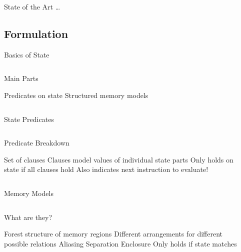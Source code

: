 \begin{frame}{State of the Art}
  \todo\dots
\end{frame}

\subsection{Formulation}

\begin{frame}{Basics of State}
  \begin{columns}
    \begin{block}{Main Parts}
      \begin{outline}[enumerate]
        \1 \alert{Predicates} on state
        \1 Structured \alert{memory models}
      \end{outline}
    \end{block}

  \end{columns}
\end{frame}

\begin{frame}{State Predicates}
  \begin{columns}
    \begin{block}{Predicate Breakdown}
      \begin{outline}
        \1 Set of \alert{clauses}
        \1 Clauses model values of individual \alert{state parts}
        \1 Only holds on state if all clauses hold
        \1 Also indicates next instruction to evaluate!
      \end{outline}
    \end{block}

    \begin{example}[Predicate]
    \end{example}
  \end{columns}
\end{frame}

\begin{frame}{Memory Models}
  \begin{columns}
    \begin{block}{What are they?}
      \begin{outline}
        \1 \alert{Forest} structure of \alert{memory regions}
        \1 Different arrangements for different possible \alert{relations}
          \2 \alert{Aliasing}
          \2 \alert{Separation}
          \2 \alert{Enclosure}
        \1 Only holds if state matches
      \end{outline}
    \end{block}

    \begin{example}
    \end{example}
  \end{columns}
\end{frame}

